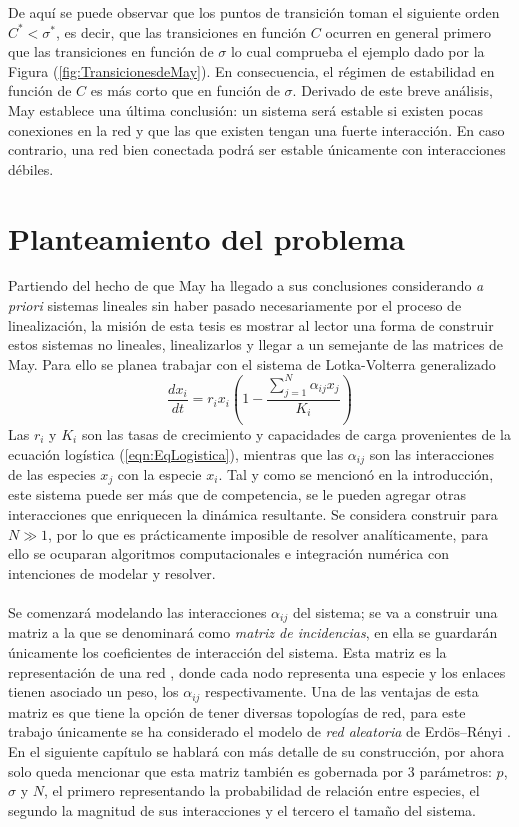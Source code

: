 De aquí se puede observar que los puntos de transición toman el siguiente orden $C^*<\sigma^*$, es decir, que las transiciones en función $C$ ocurren en general primero que las transiciones en función de $\sigma$ lo cual comprueba el ejemplo dado por la Figura (\ref{fig:TransicionesdeMay}). En consecuencia, el régimen de estabilidad en función de $C$ es más corto que en función de $\sigma$. Derivado de este breve análisis, May establece una última conclusión: un sistema será estable si existen pocas conexiones en la red y que las que existen tengan una fuerte interacción. En caso contrario, una red bien conectada podrá ser estable únicamente con interacciones débiles.
\newpage
\section{Planteamiento del problema}
Partiendo del hecho de que May ha llegado a sus conclusiones considerando \textit{a priori} sistemas lineales sin haber pasado necesariamente por el proceso de linealización, la misión de esta tesis es mostrar al lector una forma de construir estos sistemas no lineales, linealizarlos y llegar a un semejante de las matrices de May. Para ello se planea trabajar con el sistema de Lotka-Volterra generalizado \cite{may2007theoretical}
$$\frac{dx_i}{dt}=r_ix_i\left(1-\frac{\sum_{j=1}^N \alpha_{ij}x_j}{K_i}\right)$$
Las $r_i$ y $K_i$ son las tasas de crecimiento y capacidades de carga provenientes de la ecuación logística (\ref{eqn:EqLogistica}), mientras que las $\alpha_{ij}$ son las interacciones de las especies $x_j$ con la especie $x_i$. Tal y como se mencionó en la introducción, este sistema puede ser más que de competencia, se le pueden agregar otras interacciones que enriquecen la dinámica resultante. Se considera construir para $N\gg 1$, por lo que es prácticamente imposible de resolver analíticamente, para ello se ocuparan algoritmos computacionales e integración numérica con intenciones de modelar y resolver. \\
\\
Se comenzará modelando las interacciones $\alpha_{ij}$ del sistema; se va a construir una matriz a la que se denominará como \textit{matriz de incidencias}, en ella se guardarán únicamente los coeficientes de interacción del sistema. Esta matriz es la representación de una red \cite{newman2018networks}, donde cada nodo representa una especie y los enlaces tienen asociado un peso, los $\alpha_{ij}$ respectivamente. Una de las ventajas de esta matriz es que tiene la opción de tener diversas topologías de red, para este trabajo únicamente se ha considerado el modelo de \textit{red aleatoria} de Erdös–Rényi \cite{posfai2016network}. En el siguiente capítulo se hablará con más detalle de su construcción, por ahora solo queda mencionar que esta matriz también es gobernada por 3 parámetros: $p$, $\sigma$ y $N$, el primero representando la probabilidad de relación entre especies, el segundo la magnitud de sus interacciones y el tercero el tamaño del sistema. \\
